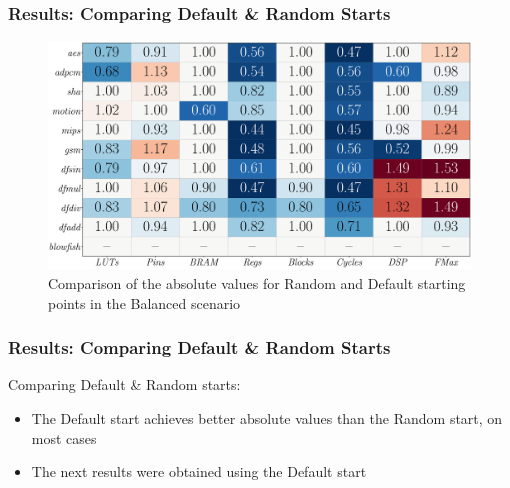 \documentclass[10pt, compress, xcolor={table,xcdraw,usenames}, aspectratio=169]{beamer}
\begin{document}
\begin{frame}
    \frametitle{Results: Comparing Default \& Random Starts}
        \begin{figure}[htpb]
            \centering
            \includegraphics[width=0.8\columnwidth]{heatmap_comp_stratixV}
            \caption{Comparison of the absolute values for Random and Default
            starting points in the Balanced scenario}
        \end{figure}
\end{frame}

\begin{frame}
    \frametitle{Results: Comparing Default \& Random Starts}
    \begin{block}{Comparing \alert{Default} \& \alert{Random} starts:}
        \begin{itemize}
            \item The \alert{Default} start achieves \alert{better absolute
                values} than the \alert{Random} start, on most cases
            \item The next results were obtained using the \alert{Default}
                start
        \end{itemize}
    \end{block}
\end{frame}
\end{document}
